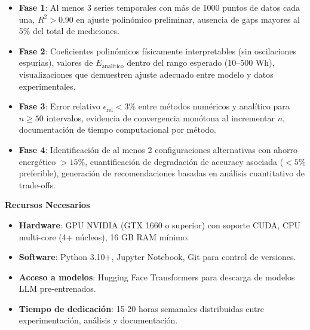 \begin{itemize}
    \item \textbf{Fase 1}: Al menos 3 series temporales con más de 1000 puntos de datos cada una, $R^2 > 0.90$ en ajuste polinómico preliminar, ausencia de gaps mayores al 5\% del total de mediciones.
    
    \item \textbf{Fase 2}: Coeficientes polinómicos físicamente interpretables (sin oscilaciones espurias), valores de $E_{\text{analítico}}$ dentro del rango esperado (10--500 Wh), visualizaciones que demuestren ajuste adecuado entre modelo y datos experimentales.
    
    \item \textbf{Fase 3}: Error relativo $\epsilon_{\text{rel}} < 3\%$ entre métodos numéricos y analítico para $n \geq 50$ intervalos, evidencia de convergencia monótona al incrementar $n$, documentación de tiempo computacional por método.
    
    \item \textbf{Fase 4}: Identificación de al menos 2 configuraciones alternativas con ahorro energético $> 15\%$, cuantificación de degradación de accuracy asociada ($< 5\%$ preferible), generación de recomendaciones basadas en análisis cuantitativo de trade-offs.
\end{itemize}

\textbf{Recursos Necesarios}

\begin{itemize}
    \item \textbf{Hardware}: GPU NVIDIA (GTX 1660 o superior) con soporte CUDA, CPU multi-core (4+ núcleos), 16 GB RAM mínimo.
    \item \textbf{Software}: Python 3.10+, Jupyter Notebook, Git para control de versiones.
    \item \textbf{Acceso a modelos}: Hugging Face Transformers para descarga de modelos LLM pre-entrenados.
    \item \textbf{Tiempo de dedicación}: 15-20 horas semanales distribuidas entre experimentación, análisis y documentación.
\end{itemize}

